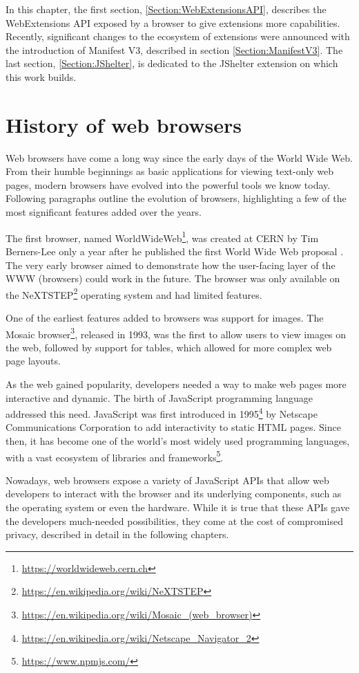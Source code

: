 In this chapter, the first section, \ref{Section:WebExtensionsAPI}, describes the WebExtensions API exposed by a browser to give extensions more capabilities. Recently, significant changes to the ecosystem of extensions were announced with the introduction of Manifest V3, described in section \ref{Section:ManifestV3}. The last section, \ref{Section:JShelter}, is dedicated to the JShelter extension on which this work builds.

\section{History of web browsers}

Web browsers have come a long way since the early days of the World Wide Web. From their humble beginnings as basic applications for viewing text-only web pages, modern browsers have evolved into the powerful tools we know today. Following paragraphs outline the evolution of browsers, highlighting a few of the most significant features added over the years.

The first browser, named WorldWideWeb\footnote{\url{https://worldwideweb.cern.ch}}, was created at CERN by Tim Berners-Lee only a year after he published the first World Wide Web proposal \cite{WWWProposal}. The very early browser aimed to demonstrate how the user-facing layer of the WWW (browsers) could work in the future. The browser was only available on the NeXTSTEP\footnote{\url{https://en.wikipedia.org/wiki/NeXTSTEP}} operating system and had limited features.

One of the earliest features added to browsers was support for images. The Mosaic browser\footnote{\url{https://en.wikipedia.org/wiki/Mosaic_(web_browser)}}, released in 1993, was the first to allow users to view images on the web, followed by support for tables, which allowed for more complex web page layouts.

As the web gained popularity, developers needed a way to make web pages more interactive and dynamic. The birth of JavaScript programming language addressed this need. JavaScript was first introduced in 1995\footnote{\url{https://en.wikipedia.org/wiki/Netscape_Navigator_2}} by Netscape Communications Corporation to add interactivity to static HTML pages. Since then, it has become one of the world's most widely used programming languages, with a vast ecosystem of libraries and frameworks\footnote{\url{https://www.npmjs.com/}}.

Nowadays, web browsers expose a variety of JavaScript APIs that allow web developers to interact with the browser and its underlying components, such as the operating system or even the hardware. While it is true that these APIs gave the developers much-needed possibilities, they come at the cost of compromised privacy, described in detail in the following chapters.

